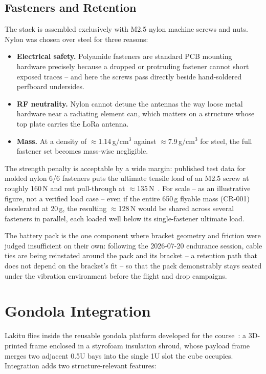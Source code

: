 \subsection{Fasteners and Retention}
\label{sec:retention}

The stack is assembled exclusively with M2.5 nylon machine screws and nuts.
Nylon was chosen over steel for three reasons:

\begin{itemize}
  \item \textbf{Electrical safety.} Polyamide fasteners are standard PCB
        mounting hardware precisely because a dropped or protruding
        fastener cannot short exposed traces -- and here the screws pass
        directly beside hand-soldered perfboard undersides.
  \item \textbf{RF neutrality.} Nylon cannot detune the antennas the way
        loose metal hardware near a radiating element can, which matters on
        a structure whose top plate carries the LoRa antenna.
  \item \textbf{Mass.} At a density of $\approx$1.14\,g/cm$^3$ against
        $\approx$7.9\,g/cm$^3$ for steel, the full fastener set becomes
        mass-wise negligible.
\end{itemize}

The strength penalty is acceptable by a wide margin: published test data
for molded nylon 6/6 fasteners puts the ultimate tensile load of an M2.5
screw at roughly 160\,N and nut pull-through at
$\approx$135\,N~\cite{microplastics}. For scale -- as an illustrative
figure, not a verified load case -- even if the entire 650\,g flyable mass
(CR-001) decelerated at 20\,g, the resulting $\approx$128\,N would be
shared across several fasteners in parallel, each loaded well below its
single-fastener ultimate load.

The battery pack is the one component where bracket geometry and friction
were judged insufficient on their own: following the 2026-07-20 endurance
session, cable ties are being reinstated around the pack and its bracket --
a retention path that does not depend on the bracket's fit -- so that the
pack demonstrably stays seated under the vibration environment before the
flight and drop campaigns.

\section{Gondola Integration}
\label{sec:gondola}

Lakitu flies inside the reusable gondola platform developed for the
course~\cite{kessler}: a 3D-printed frame enclosed in a styrofoam insulation
shroud, whose payload frame merges two adjacent 0.5U bays into the single 1U
slot the cube occupies. Integration adds two structure-relevant features:

